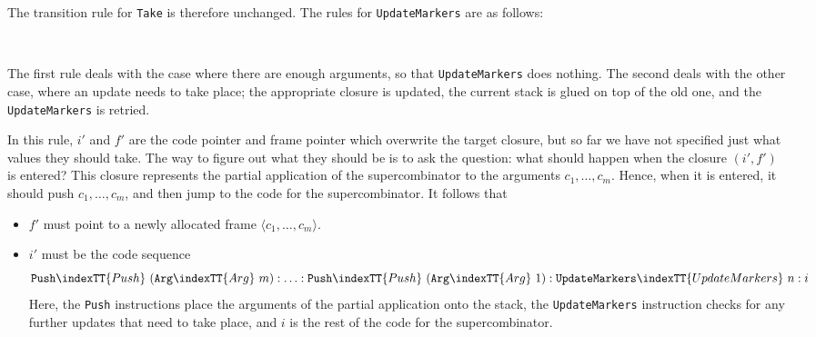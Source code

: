 The transition rule for \mbox{\tt Take} is therefore unchanged. The rules for
\mbox{\tt UpdateMarkers} are as follows:
\begin{etimruleVD}
\\ \hline
{}
\end{etimruleVD}
The first rule deals with the case where there are enough arguments, so that
\mbox{\tt UpdateMarkers} does nothing.  The second deals with the
other case, where an update
needs to take place; the appropriate closure is updated, the current stack
is glued on top of the old one, and the \mbox{\tt UpdateMarkers} is retried.

In this rule, $i'$ and $f'$ are the
code pointer and frame pointer which overwrite the target closure, but
so far we have not specified just what values they should take.
The way to figure out what they should be is to ask the question: what should
happen when the closure $(i',f')$ is entered?  This closure represents the
partial
application of the supercombinator to the arguments $c_1, \ldots, c_m$.  Hence,
when it is entered, it should push $c_1, \ldots, c_m$, and then jump to
the code for the supercombinator.  It follows that
\begin{itemize}
\item
$f'$ must point to a newly allocated frame $\langle c_1, \ldots, c_m \rangle$.
\item
$i'$ must be the code sequence
\[
\mbox{\tt Push}\indexTT{Push}~(\mbox{\tt Arg}\indexTT{Arg}~m): \ldots: \mbox{\tt Push}\indexTT{Push}~(\mbox{\tt Arg}\indexTT{Arg}~1): \mbox{\tt UpdateMarkers}\indexTT{UpdateMarkers}~n: i
\]
Here, the \mbox{\tt Push} instructions place the arguments of the partial
application onto the stack, the \mbox{\tt UpdateMarkers} instruction checks for
any further updates that need to take place, and $i$ is the rest of the
code for the supercombinator.
\end{itemize}

